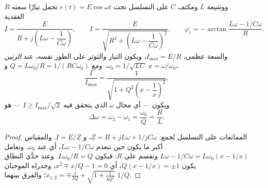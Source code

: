 \begin{theorem}\label{thm:b1:sinusoidal-impedance:resonance}
 $R$ ووشيعة $L$ ومكثف $C$ على التسلسل تحت
$e(t) = E\cos\omega t$ تحمل تيارًا سعته العقدية
\[
\underline I = \frac{E}{R + j\left(L\omega - \dfrac{1}{C\omega}\right)},
\qquad
I = \frac{E}{\sqrt{R^2 + \left(L\omega - \dfrac{1}{C\omega}\right)^2}},
\qquad
\varphi_i = -\arctan\frac{L\omega - 1/C\omega}{R} .
\]
والسعة عظمى، $I_{\max} = E/R$، ويكون التيار والتوتر على الطور
نفسه، عند \emph{الرنين} $\omega_0 = 1/\sqrt{LC}$. ومع
$Q = L\omega_0/R = 1/(RC\omega_0)$ و $x = \omega/\omega_0$،
\[
\frac{I}{I_{\max}} = \frac{1}{\sqrt{1 + Q^2\left(x - \dfrac1x\right)^2}} ,
\]
ويكون \emph{} --- أي مجال $\omega$ الذي يتحقق فيه
$I \geq I_{\max}/\sqrt2$ --- هو
\[
\Delta\omega = \omega_2 - \omega_1 = \frac{\omega_0}{Q} = \frac{R}{L} .
\]
\end{theorem}

\begin{proof}
الممانعات على التسلسل تُجمع: $\underline Z = R + jL\omega + 1/jC\omega$، و
$\underline I = \underline E/\underline Z$. والمقياس أكبر ما يكون حين
تنعدم  $L\omega - 1/C\omega$، أي عند $\omega_0$.
ونعامل $L\omega - 1/C\omega = L\omega_0(x - 1/x)$ ونقسم على $R$:
فيكون $L\omega_0/R = Q$. وعند حدَّي النطاق يكون $Q(x - 1/x) = \pm 1$، أي
$x^2 \mp x/Q - 1 = 0$، وجذراه الموجبان $x_{1,2} = \mp\frac{1}{2Q}
+ \sqrt{1 + \frac{1}{4Q^2}}$؛ والفرق بينهما $1/Q$.
\end{proof}

